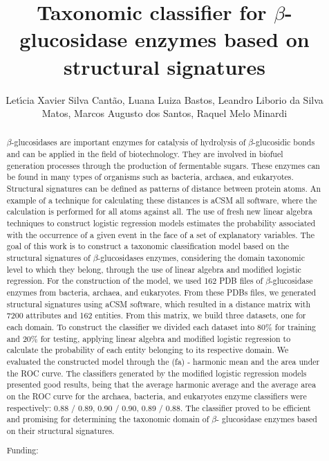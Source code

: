 \documentclass[twoside]{article}
\title{\vspace{-15mm}\fontsize{24pt}{10pt}\selectfont\textbf{ Taxonomic classifier for $\beta$-glucosidase enzymes based on structural signatures }} %
\author{ Let\'{\i}cia Xavier Silva Cant\~ao, Luana Luiza Bastos, Leandro Liborio da Silva Matos, Marcos Augusto dos Santos, Raquel Melo Minardi }
\affil{ Universidade Federal de Minas Gerais - UFMG }
\date{}
\begin{document}
  
  
  \maketitle %
  
  
  \thispagestyle{fancy} %
  
  
  \begin{abstract}
  $\beta$-glucosidases are important enzymes for catalysis of hydrolysis of $\beta$-glucosidic bonds and can be applied in the field of biotechnology. They are involved in biofuel generation processes through the production of fermentable sugars. These enzymes can be found in many types of organisms such as bacteria,  archaea,  and eukaryotes. Structural signatures can be defined as patterns of distance between protein atoms. An example of a technique for calculating these distances is aCSM all software,  where the calculation is performed for all atoms against all. The use of fresh new linear algebra techniques to construct logistic regression models estimates the probability associated with the occurrence of a given event in the face of a set of explanatory variables. The goal of this work is to construct a taxonomic classification model based on the structural signatures of $\beta$-glucosidases enzymes,  considering the domain taxonomic level to which they belong,  through the use of linear algebra and modified logistic regression. For the construction of the model,  we used 162 PDB files of $\beta$-glucosidase enzymes from bacteria,  archaea,  and eukaryotes. From these PDBs files,  we generated structural signatures using aCSM software,  which resulted in a distance matrix with 7200 attributes and 162 entities. From this matrix,  we build three datasets,  one for each domain. To construct the classifier we divided each dataset into 80\% for training and 20\% for testing,  applying linear algebra and modified logistic regression to calculate the probability of each entity belonging to its respective domain. We evaluated the constructed model through the (fa) - harmonic mean and the area under the ROC curve. The classifiers generated by the modified logistic regression models presented good results,  being that the average harmonic average and the average area on the ROC curve for the archaea,  bacteria,  and eukaryotes enzyme classifiers were respectively: 0.88 / 0.89,  0.90 / 0.90,  0.89 / 0.88. The classifier proved to be efficient and promising for determining the taxonomic domain of $\beta$- glucosidase enzymes based on their structural signatures.
  
  Funding:  \\ 
  \end{abstract}
  
\end{document}
